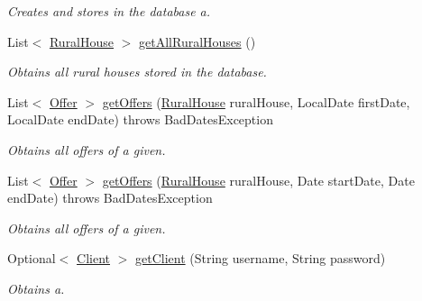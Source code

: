 \begin{DoxyCompactItemize}
\begin{DoxyCompactList}\small\item\em Creates and stores in the database a. \end{DoxyCompactList}\item 
List$<$ \mbox{\hyperlink{a00188}{Rural\+House}} $>$ \mbox{\hyperlink{a00144_acb92be47dc680218ff3102addce8ae8f}{get\+All\+Rural\+Houses}} ()
\begin{DoxyCompactList}\small\item\em Obtains all rural houses stored in the database. \end{DoxyCompactList}\item 
List$<$ \mbox{\hyperlink{a00184}{Offer}} $>$ \mbox{\hyperlink{a00144_a54bd9542b20644ccd47961ca260d17b4}{get\+Offers}} (\mbox{\hyperlink{a00188}{Rural\+House}} rural\+House, Local\+Date first\+Date, Local\+Date end\+Date)  throws Bad\+Dates\+Exception 
\begin{DoxyCompactList}\small\item\em Obtains all offers of a given. \end{DoxyCompactList}\item 
List$<$ \mbox{\hyperlink{a00184}{Offer}} $>$ \mbox{\hyperlink{a00144_ad428053d12fae95599312c13951f9c87}{get\+Offers}} (\mbox{\hyperlink{a00188}{Rural\+House}} rural\+House, Date start\+Date, Date end\+Date)  throws Bad\+Dates\+Exception 
\begin{DoxyCompactList}\small\item\em Obtains all offers of a given. \end{DoxyCompactList}\item 
Optional$<$ \mbox{\hyperlink{a00164}{Client}} $>$ \mbox{\hyperlink{a00144_a6df6a0502595b73be0f6d238743eeda5}{get\+Client}} (String username, String password)
\begin{DoxyCompactList}\small\item\em Obtains a. \end{DoxyCompactList}\end{DoxyCompactItemize}
